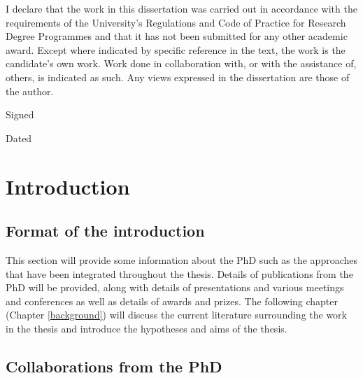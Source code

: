 \documentclass[11pt,twoside]{bristolthesis}
\begin{document}
  \begin{declaration}
    I declare that the work in this dissertation was carried out in accordance with the requirements of the University's Regulations and Code of Practice for Research Degree Programmes and that it has not been submitted for any other academic award. Except where indicated by specific reference in the text, the work is the candidate's own work. Work done in collaboration with, or with the assistance of, others, is indicated as such. Any views expressed in the dissertation are those of the author.

    \bigskip
    \bigskip
    \bigskip
    \bigskip
    \bigskip

    Signed

    \bigskip
    \bigskip
    \bigskip
    \bigskip
    \bigskip

    Dated
  \end{declaration}
  \hypersetup{linkcolor=black}
  \setcounter{tocdepth}{2}
  \tableofcontents
  \listoftables
  \listoffigures

\mainmatter %
\pagestyle{plain}
\hypertarget{introduction}{%
\chapter{Introduction}\label{introduction}}

\hypertarget{format-of-the-introduction}{%
\section{Format of the introduction}\label{format-of-the-introduction}}

This section will provide some information about the PhD such as the approaches that have been integrated throughout the thesis. Details of publications from the PhD will be provided, along with details of presentations and various meetings and conferences as well as details of awards and prizes. The following chapter (Chapter \ref{background}) will discuss the current literature surrounding the work in the thesis and introduce the hypotheses and aims of the thesis.

\hypertarget{collaborations-from-the-phd}{%
\section{Collaborations from the PhD}\label{collaborations-from-the-phd}}
\end{document}
